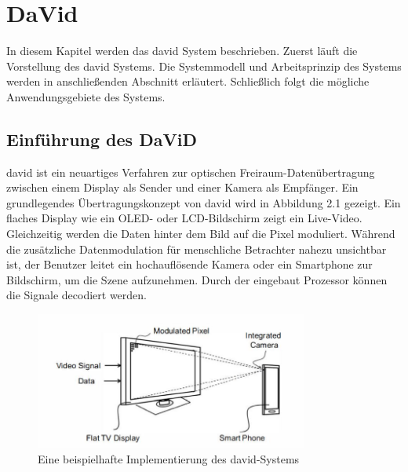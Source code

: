\chapter{DaVid} \label{cha:DaVid}

In diesem Kapitel werden das \gls{david} System beschrieben. Zuerst läuft die Vorstellung des \gls{david} Systems. Die Systemmodell und Arbeitsprinzip des Systems werden in anschließenden Abschnitt erläutert. Schließlich folgt die mögliche Anwendungsgebiete des Systems. \cite{Kays2017,Kays2016,Kays201501,Kays201502}




\section{Einführung des DaViD } 

\gls{david} ist ein neuartiges Verfahren zur optischen Freiraum-Datenübertragung zwischen einem Display als Sender und einer Kamera als Empfänger. Ein grundlegendes Übertragungskonzept von \gls{david} wird in Abbildung 2.1 gezeigt. Ein flaches Display wie ein OLED- oder LCD-Bildschirm zeigt ein Live-Video. Gleichzeitig werden die Daten hinter dem Bild auf die Pixel moduliert. Während die zusätzliche Datenmodulation für menschliche Betrachter nahezu unsichtbar ist, der Benutzer leitet ein hochauflösende Kamera oder ein Smartphone zur Bildschirm, um die Szene aufzunehmen. Durch der eingebaut Prozessor können die Signale decodiert werden.

\begin{figure}[htb]
 \centering 
 \includegraphics[keepaspectratio,width=0.8\textwidth]{images/2_DaViD/David1.jpg}
 \caption{Eine beispielhafte Implementierung des \gls{david}-Systems}
 \label{fig:David1}
\end{figure}



